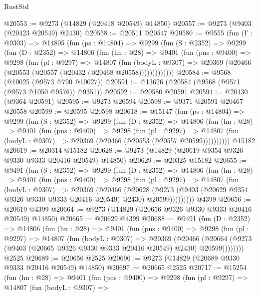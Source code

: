 \begin{lexlean}{RustStd}
\begin{coremodule}
@20553 := @9273 (@14829 (@20418 @20549) @14850)
@20557 := @9273 (@9403 (@20423 @20549) @2430)
@20558 := @20511 @20547
@20580 := @9555
    (fun (Γ : @9303) =>
    @14805
      (fun (ps : @14804) =>
      @9299
        (fun (S : @2352) =>
        @9299
          (fun (D : @2352) =>
          @14806
            (fun (hn : @28) =>
            @9401
              (fun (pns : @9400) =>
              @9298
                (fun (pl : @9297) =>
                @14807
                  (fun (bodyL : @9307) =>
                  @20369 (@20466 (@20553 (@20557 (@20432 (@20468 @20558)))))))))))))
@20584 := @9568 (@10025 (@9573 @790 @10027))
@20591 := @13626 (@20584 (@9568 (@9571 (@9573 @1050 @9576)) @9351))
@20592 := @20580 @20591
@20594 := @20430 (@9364 @20591)
@20595 := @9273 @20594
@20598 := @9371 @20591 @20467 @20558
@20599 := @20595 @20598
@20618 := @15147
    (fun (ps : @14804) =>
    @9299
      (fun (S : @2352) =>
      @9299
        (fun (D : @2352) =>
        @14806
          (fun (hn : @28) =>
          @9401
            (fun (pns : @9400) =>
            @9298
              (fun (pl : @9297) =>
              @14807 (fun (bodyL : @9307) => @20369 (@20466 (@20553 (@20557 @20599))))))))))
    @15182
@20619 := @20314 @15182
@20628 := @9273 (@14829 (@20619 @9354 @9326 @9330 @9333 @20416 @20549) @14850)
@20629 := @20325 @15182
@20655 := @9491
    (fun (S : @2352) =>
    @9299
      (fun (D : @2352) =>
      @14806
        (fun (hn : @28) =>
        @9401
          (fun (pns : @9400) =>
          @9298
            (fun (pl : @9297) =>
            @14807
              (fun (bodyL : @9307) =>
              @20369
                (@20466
                  (@20628
                    (@9273
                      (@9403 (@20629 @9354 @9326 @9330 @9333 @20416 @20549) @2430)
                      @20599)))))))))
    @4399
@20656 := @20619 @4399
@20664 := @9273 (@14829 (@20656 @9326 @9330 @9333 @20416 @20549) @14850)
@20665 := @20629 @4399
@20688 := @9491
    (fun (D : @2352) =>
    @14806
      (fun (hn : @28) =>
      @9401
        (fun (pns : @9400) =>
        @9298
          (fun (pl : @9297) =>
          @14807
            (fun (bodyL : @9307) =>
            @20369
              (@20466
                (@20664 (@9273 (@9403 (@20665 @9326 @9330 @9333 @20416 @20549) @2430) @20599))))))))
    @2525
@20689 := @20656 @2525
@20696 := @9273 (@14829 (@20689 @9330 @9333 @20416 @20549) @14850)
@20697 := @20665 @2525
@20717 := @15254
    (fun (hn : @28) =>
    @9401
      (fun (pns : @9400) =>
      @9298
        (fun (pl : @9297) =>
        @14807
          (fun (bodyL : @9307) =>

\end{coremodule}
\end{lexlean}

